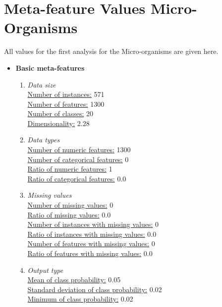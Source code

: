 \documentclass[10pt,a4paper]{report}
\begin{document}
	\section{Meta-feature Values Micro-Organisms}
	
	\label{app:MetafeatureValuesMO}
	
	All values for the first analysis for the Micro-organisms are given here.
	
	\begin{itemize}
		\item \textbf{Basic meta-features}\\
		\begin{enumerate}
			\item \textit{Data size} \\
			\underline{Number of instances:} 571 \\
			\underline{Number of features:} 1300 \\
			\underline{Number of classes:} 20 \\
			\underline{Dimensionality:} 2.28\\
			\item \textit{Data types} \\
			\underline{Number of numeric features:} 1300 \\
			\underline{Number of categorical features:} 0 \\
			\underline{Ratio of numeric features:} 1 \\
			\underline{Ratio of categorical features:} 0.0 \\
			\item \textit{Missing values} \\
			\underline{Number of missing values:} 0 \\
			\underline{Ratio of missing values:} 0.0 \\
			\underline{Number of instances with missing values:} 0 \\
			\underline{Ratio of instances with missing values:} 0.0 \\
			\underline{Number of features with missing values:} 0 \\
			\underline{Ratio of features with missing values:} 0.0 \\
			\item \textit{Output type} \\
			\underline{Mean of class probability:} 0.05 \\
			\underline{Standard deviation of class probability:} 0.02 \\
			\underline{Minimum of class probability:} 0.02 \\

\end{enumerate}
\end{itemize}
\end{document}
